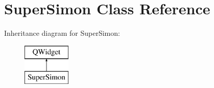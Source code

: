 \hypertarget{class_super_simon}{}\section{Super\+Simon Class Reference}
\label{class_super_simon}
Inheritance diagram for Super\+Simon\+:\begin{figure}[H]
\begin{center}
\leavevmode
\includegraphics[height=2.000000cm]{class_super_simon}
\end{center}
\end{figure}
